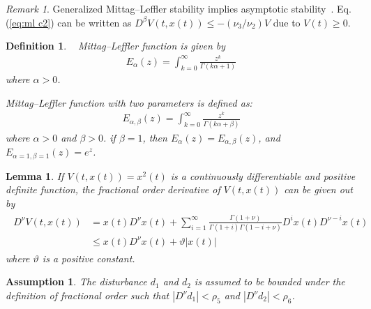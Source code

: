 \documentclass[ShortAfour]{sage}
\theoremstyle{plain}
\newtheorem{myas}{Assumption}
\newtheorem{mydef}{Definition}
\newtheorem{mylem}{Lemma}
\theoremstyle{remark}
\newtheorem{myrem}{Remark}
\begin{document}
\begin{myrem}
  Generalized Mittag--Leffler stability implies asymptotic stability~\cite{Li2010}. Eq.(\ref{eq:ml c2}) can be written as $D^\beta V(t,x(t))\le -(\nu_3/\nu_2) V$ due to $V(t)\ge 0$.
\end{myrem}
\begin{mydef}~\cite{Podlubny1999}
  Mittag--Leffler function is given by
  \begin{align}
    E_\alpha(z)=\int^\infty_{k=0}\frac{z^k}{\Gamma(k\alpha+1)}
  \end{align}
  where $\alpha>0$. 
  
  Mittag--Leffler function with two parameters is defined as:
  \begin{align}
    E_{\alpha,\beta}(z)=\int^\infty_{k=0}\frac{z^k}{\Gamma(k\alpha+\beta)}
  \end{align}
  where $\alpha>0$ and $\beta>0$. if $\beta=1$, then $E_\alpha(z)=E_{\alpha,\beta}(z)$, and $E_{\alpha=1,\beta=1}(z)=e^z$.
\end{mydef}
\begin{mylem}\cite{Aghababa2014}\label{lem:v}
  If $V(t,x(t))=x^2(t)$ is a continuously differentiable and positive definite function, the fractional order derivative of $V(t,x(t))$ can be given out by
  \begin{align}\begin{split}
    D^\nu V(t,x(t))&=x(t)D^\nu x(t)+\sum^\infty_{i=1}\frac{\Gamma(1+\nu)}{\Gamma(1+i)\Gamma(1-i+\nu)}D^ix(t)D^{\nu-i}x(t)\\
    &\le x(t)D^\nu x(t)+\vartheta\vert x(t)\vert
  \end{split}\end{align}
  where $\vartheta$ is a positive constant.
\end{mylem}
\begin{myas}\label{as:2}
  The disturbance $d_1$ and $d_2$ is assumed to be bounded under the definition of fractional order such that $\left\vert D^\nu d_1\right\vert<\rho_5$ and $\left\vert D^\nu d_2\right\vert<\rho_6$.
\end{myas}
\end{document}

